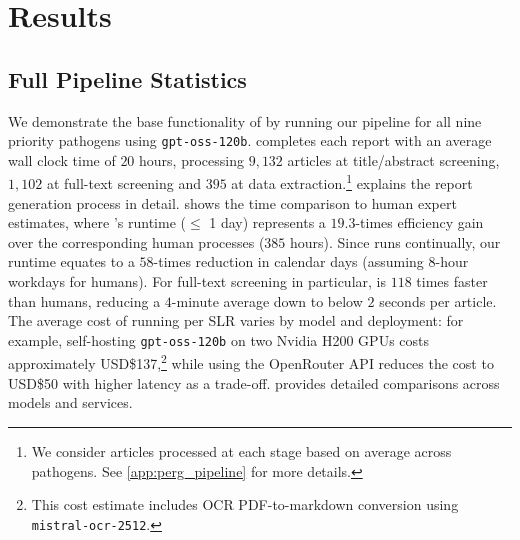 \section{Results}\label{sec:pipeline_experimental_results}

\subsection{Full Pipeline Statistics}\label{sec:full_pipeline_statistics}
We demonstrate the base functionality of \name{} by running our pipeline for all nine priority pathogens using \texttt{gpt-oss-120b}. \name{} completes each report with an average wall clock time of $20$ hours, processing $9,132$ articles at title/abstract screening, $1,102$ at full-text screening and $395$ at data extraction.\footnote{We consider articles processed at each stage based on average across pathogens. See \cref{app:perg_pipeline} for more details.}  explains the report generation process in detail.  shows the time comparison to human expert estimates, where \name{}'s runtime ($\le$ 1 day) represents a $19.3$-times efficiency gain over the corresponding human processes ($385$ hours).  Since \name{} runs continually, our runtime equates to a 
$58$-times reduction in calendar days (assuming $8$-hour workdays for 
humans). For full-text screening in particular, \name{} is $118$ times faster than humans, reducing a $4$-minute average down to below $2$ seconds per article.  The average cost of running \name{} per SLR varies by model and deployment: for example, self-hosting \texttt{gpt-oss-120b} on two Nvidia H200 GPUs costs approximately USD\$137,\footnote{This cost estimate includes OCR PDF-to-markdown conversion using \texttt{mistral-ocr-2512}.} while using the OpenRouter API reduces the cost to USD\$50 with higher latency as a trade-off.  provides detailed comparisons across models and services.



